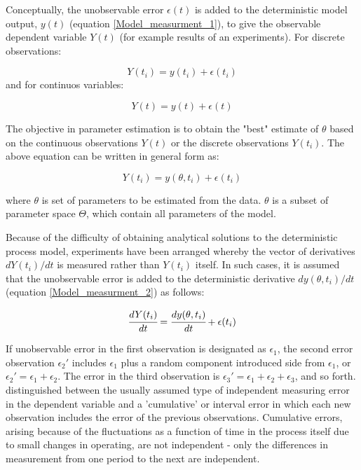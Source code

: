\documentclass[../Article_Model_Parameters.tex]{subfiles}
\begin{document}
	
Conceptually, the unobservable error $\epsilon(t)$ is added to the deterministic model output, $y(t)$ (equation \ref{Model_measurment_1}), to give the observable dependent variable $Y(t)$ (for example results of an experiments). For discrete observations:

{\footnotesize
	\begin{equation*}
		Y(t_i) = y(t_i) + \epsilon(t_i)
\end{equation*} }
and for continuos variables:

{\footnotesize
	\begin{equation*}
		Y(t) = y(t) + \epsilon(t)
\end{equation*} }

The objective in parameter estimation is to obtain the "best" estimate of $\theta$ based on the continuous observations $Y(t)$ or the discrete observations $Y(t_i)$. The above equation can be written in general form as:

{\footnotesize
	\begin{equation} \label{EQ: Measurment_noise}
		Y(t_i) = y(\theta, t_i) + \epsilon(t_i)
\end{equation}}

where $\theta$ is set of parameters to be estimated from the data. $\theta$ is a subset of parameter space $\Theta$, which contain all parameters of the model.

Because of the difficulty of obtaining analytical solutions to the deterministic process model, experiments have been arranged whereby the vector of derivatives $d Y(t_i)/dt$ is measured rather than $Y(t_i)$ itself. In such cases, it is assumed that the unobservable error is added to the deterministic derivative $dy(\theta, t_i)/dt$ (equation \ref{Model_measurment_2}) as follows:

{\footnotesize
	\begin{equation*}
		\cfrac{d Y(t_i)}{dt} = \cfrac{dy(\theta, t_i)}{dt} + \epsilon(t_i)
\end{equation*} }

If unobservable error in the first observation is designated as $\epsilon_1$, the second error observation $\epsilon_2'$ includes $\epsilon_1$ plus a random component introduced side from $\epsilon_1$, or $\epsilon_2' = \epsilon_1 + \epsilon_2$. The error in the third observation is $\epsilon_3' = \epsilon_1 + \epsilon_2 + \epsilon_3$, and so forth. \citet{Mandel1957} distinguished between the usually assumed type of independent measuring error in the dependent variable and a 'cumulative' or interval error in which each new observation includes the error of the previous observations. Cumulative errors, arising because of the fluctuations as a function of time in the process itself due to small changes in operating, are not independent - only the differences in measurement from one period to the next are independent.
\end{document}
